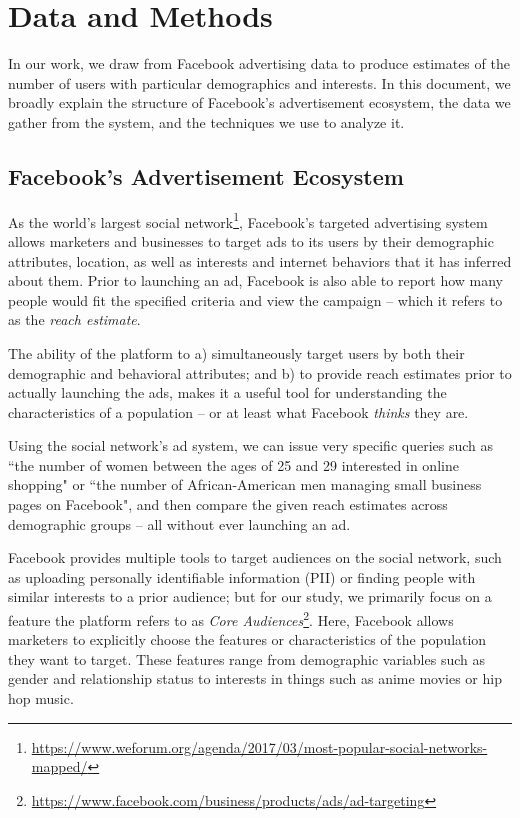 \chapter{Data and Methods} \label{chap:data}

In our work, we draw from Facebook advertising data to produce estimates of the number of users with particular demographics and interests. In this document, we broadly explain the structure of Facebook's advertisement ecosystem, the data we gather from the system, and the techniques we use to analyze it.


\section{Facebook's Advertisement Ecosystem} \label{sec:fb_ad_eco}


As the world's largest social network\footnote{\url{https://www.weforum.org/agenda/2017/03/most-popular-social-networks-mapped/}}, Facebook's targeted advertising system allows marketers and businesses to target ads to its users by their demographic attributes, location, as well as interests and internet behaviors that it has inferred about them. Prior to launching an ad, Facebook is also able to report how many people would fit the specified criteria and view the campaign -- which it refers to as the \textit{reach estimate}.

The ability of the platform to a) simultaneously target users by both their demographic and behavioral attributes; and b) to provide reach estimates prior to actually launching the ads, makes it a useful tool for understanding the characteristics of a population -- or at least what Facebook \textit{thinks} they are.

Using the social network's ad system, we can issue very specific queries such as ``the number of women between the ages of 25 and 29 interested in online shopping" or ``the number of African-American men managing small business pages on Facebook", and then compare the given reach estimates across demographic groups -- all without ever launching an ad.

Facebook provides multiple tools to target audiences on the social network, such as uploading personally identifiable information (PII) or finding people with similar interests to a prior audience; but for our study, we primarily focus on a feature the platform refers to as \textit{Core Audiences}\footnote{\url{https://www.facebook.com/business/products/ads/ad-targeting}}. Here, Facebook allows marketers to explicitly choose the features or characteristics of the population they want to target. These features range from demographic variables such as gender and relationship status to interests in things such as anime movies or hip hop music.


